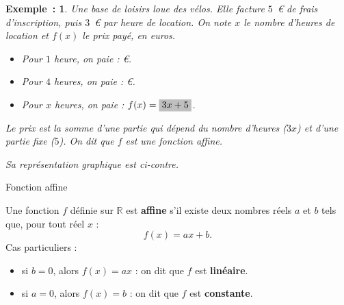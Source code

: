 \documentclass[12pt]{article}
\theoremstyle{break}
\newtheorem*{example}{Exemple~:}
\theoremstyle{inline}
\begin{document}
\begin{minipage}[t]{0.55\linewidth}
  \begin{example}
  Une base de loisirs loue des vélos.
  Elle facture $5$~€ de frais d'inscription, puis $3$~€ par heure de location.
  On note $x$ le nombre d'heures de location et $f(x)$ le prix payé, en euros.

    \vspace{0pt}
    \begin{itemize}
      \item Pour $1$ heure, on paie :  €.
      \item Pour $4$ heures, on paie :  €.
      \item Pour $x$ heures, on paie : $f(x) = \hideM{3x + 5}$.
    \end{itemize}

    \medskip
    Le prix est la somme d'une partie qui \emph{dépend} du nombre d'heures ($3x$) et d'une partie \emph{fixe} ($5$).
    On dit que $f$ est une fonction affine.

    \medskip
    Sa représentation graphique est ci-contre.
  \end{example}
\end{minipage}
\hfill
\begin{minipage}[t]{0.4\linewidth}
  \vspace{0pt}
  \centering
\end{minipage}

\begin{definition}{Fonction affine}{}
  \begin{multihide}
    Une fonction $f$ définie sur $\mathbb{R}$ est \textbf{affine} s'il existe deux nombres réels $a$ et $b$ tels que, pour tout réel $x$ :
    \[
      f(x) = ax + b.
    \]
    Cas particuliers :
    \begin{itemize}
      \item si $b = 0$, alors $f(x) = ax$ : on dit que $f$ est \textbf{linéaire}.%
      \item si $a = 0$, alors $f(x) = b$ : on dit que $f$ est \textbf{constante}.
    \end{itemize}
  \end{multihide}
\end{definition}
\end{document}
